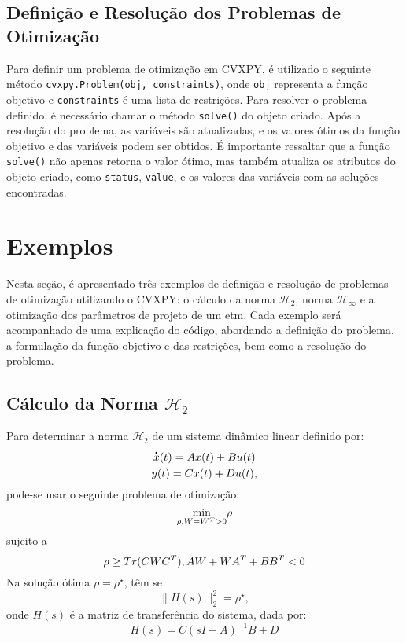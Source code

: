 \subsection{Definição e Resolução dos Problemas de Otimização}

Para definir um problema de otimização em CVXPY, é utilizado o seguinte método \texttt{cvxpy.Problem(obj, constraints)}, onde \texttt{obj} representa a função objetivo e \texttt{constraints} é uma lista de restrições. Para resolver o problema definido, é necessário chamar o método \texttt{solve()} do objeto criado. Após a resolução do problema, as variáveis são atualizadas, e os valores ótimos da função objetivo e das variáveis podem ser obtidos. É importante ressaltar que a função \texttt{solve()} não apenas retorna o valor ótimo, mas também atualiza os atributos do objeto criado, como \texttt{status}, \texttt{value}, e os valores das variáveis com as soluções encontradas.

\section{Exemplos}

Nesta seção, é apresentado três exemplos de definição e resolução de problemas de otimização utilizando o CVXPY: o cálculo da norma $\mathcal{H}_{2}$, norma $\mathcal{H}_{\infty}$ e a otimização dos parâmetros de projeto de um \acrshort{etm}. Cada exemplo será acompanhado de uma explicação do código, abordando a definição do problema, a formulação da função objetivo e das restrições, bem como a resolução do problema.

\subsection{Cálculo da Norma $\mathcal{H}_{2}$}

Para determinar a norma $\mathscr{H} _2$ de um sistema dinâmico linear definido por: \begin{gather} \dt{x}(t) = Ax(t) + Bu(t) \\ y(t) = Cx(t) + Du(t), \label{sistema_linear_h2}\end{gather} pode-se usar o seguinte problema de otimização: \begin{equation} \underset{\rho, \space W = W^T > 0}{\min} \space\space \rho \end{equation} sujeito a \begin{equation}
\rho \geq Tr(CWC^T), \space
AW + WA^T + BB^T < 0
\end{equation} Na solução ótima $\rho = \rho^\star$, têm se \begin{equation} \lVert H(s) \rVert ^ 2 _ 2 = \rho^\star, \end{equation} onde $H(s)$ é a matriz de transferência do sistema, dada por: \begin{equation} H(s) = C(sI- A)^{-1}B +D  \end{equation}

